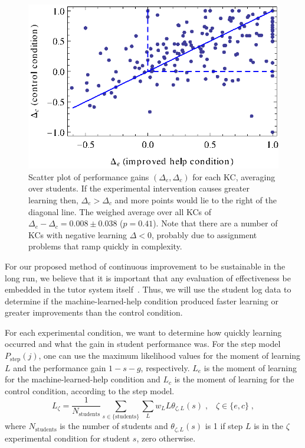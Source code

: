 \documentclass{edm_template}
\begin{document}
\begin{figure}
   \centering\includegraphics{scatter-gain.eps}
   \caption{Scatter plot of performance gains $\left(\Delta_e,\Delta_c\right)$
   for each KC, averaging over students.  If the experimental intervention
   causes greater learning then, $\Delta_e > \Delta_c$ and more points
   would lie to the right of the diagonal line.
   The weighed average over all KCs of $\Delta_e - \Delta_c = 
        0.008\pm 0.038$ ($p=0.41$).
   Note that there are a number
   of KCs with negative learning $\Delta<0$, probably due to 
   assignment problems that ramp quickly in complexity. 
   }\label{scattergain}
\end{figure}

For our proposed method of continuous improvement to be sustainable in
the long run, we believe that it is important that any evaluation of
effectiveness be embedded in the tutor system
itself~\cite{vanlehn_intelligent_2008}.  Thus, we will use the student
log data to determine if the machine-learned-help condition produced faster
learning or greater improvements than the control condition.


For each experimental condition, we want to determine how quickly
learning occurred and what the gain in student performance was.
For the step model $P_\mathrm{step}(j)$, one can use the maximum
likelihood values for the moment of learning $L$ and the
performance gain $1-s-g$, respectively.  
$L_e$ is the moment of learning for the machine-learned-help condition
and $L_c$ is the moment of learning for the control condition,
according to the step model.
%
\begin{equation}
L_\zeta = \frac{1}{N_\mbox{students}}\sum_{s \in \{\mbox{students}\}}
\sum_L w_L L \theta_{\zeta,L}(s) \;, \;\;\; \zeta \in \{e,c\} \; ,
\end{equation}
where $N_\mbox{students}$ is the number of students and 
$\theta_{\zeta,L}(s)$ is 1 if step $L$ is in the $\zeta$ experimental
condition for student $s$, zero otherwise.
\end{document}
